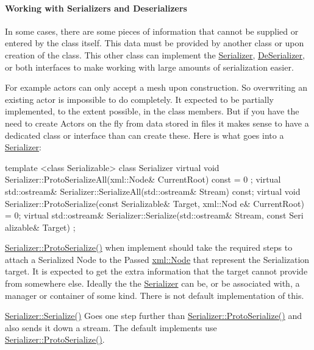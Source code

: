  \par
 \hypertarget{Serialization_serializationserializers}{}\paragraph{Working with Serializers and Deserializers}\label{Serialization_serializationserializers}
In some cases, there are some pieces of information that cannot be supplied or entered by the class itself. This data must be provided by another class or upon creation of the class. This other class can implement the \hyperlink{classMezzanine_1_1Serializer}{Serializer}, \hyperlink{classMezzanine_1_1DeSerializer}{DeSerializer}, or both interfaces to make working with large amounts of serialization easier. \par
 \par
 For example actors can only accept a mesh upon construction. So overwriting an existing actor is impossible to do completely. It expected to be partially implemented, to the extent possible, in the class members. But if you have the need to create Actors on the fly from data stored in files it makes sense to have a dedicated class or interface than can create these. Here is what goes into a \hyperlink{classMezzanine_1_1Serializer}{Serializer}: 
\begin{DoxyCode}
 template <class Serializable> class Serializer
 {
     virtual void Serializer::ProtoSerializeAll(xml::Node& CurrentRoot) const = 0
      ;
     virtual std::ostream& Serializer::SerializeAll(std::ostream& Stream) const;
     virtual void Serializer::ProtoSerialize(const Serializable& Target, xml::Nod
      e& CurrentRoot) = 0;
     virtual std::ostream& Serializer::Serialize(std::ostream& Stream, const Seri
      alizable& Target)
 };
\end{DoxyCode}
 \hyperlink{classMezzanine_1_1Serializer_af756e6eba414a1dca624d452abf4bf63}{Serializer::ProtoSerialize()} when implement should take the required steps to attach a Serialized Node to the Passed \hyperlink{classMezzanine_1_1xml_1_1Node}{xml::Node} that represent the Serialization target. It is expected to get the extra information that the target cannot provide from somewhere else. Ideally the the \hyperlink{classMezzanine_1_1Serializer}{Serializer} can be, or be associated with, a manager or container of some kind. There is not default implementation of this. \par
 \par
 \hyperlink{classMezzanine_1_1Serializer_af71f7716c36ba0a583ab1e29e08cac6d}{Serializer::Serialize()} Goes one step further than \hyperlink{classMezzanine_1_1Serializer_af756e6eba414a1dca624d452abf4bf63}{Serializer::ProtoSerialize()} and also sends it down a stream. The default implements use \hyperlink{classMezzanine_1_1Serializer_af756e6eba414a1dca624d452abf4bf63}{Serializer::ProtoSerialize()}. \par
